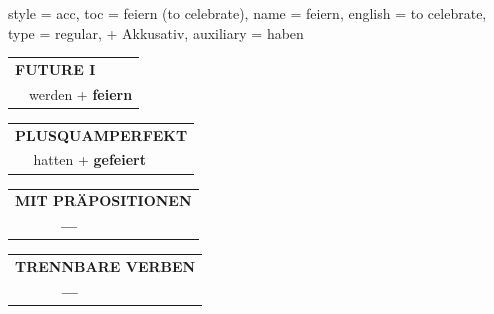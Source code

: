 \begin{verbentry}{
  style = {acc},
  toc = {feiern (to celebrate)},
  name = {feiern},
  english = {to celebrate},
  type = {regular, + Akkusativ},
  auxiliary = {haben}
}
\begin{tabular}{rl}
    \multicolumn{2}{l}{\textbf{FUTURE I} }\\
  &  werden + \textbf{feiern}\\
 
  \end{tabular}
\hfill
   \begin{tabular}{rl}
      \multicolumn{2}{l}{\textbf{PLUSQUAMPERFEKT}}\\
  &  hatten + \textbf{gefeiert}\\
  \end{tabular}
  
  
\vspace{10pt}

\begin{tabular}{lll}
\multicolumn{3}{l}{\textbf{MIT PRÄPOSITIONEN}}\\
& \textbf{---} & \\
\end{tabular}
\hfill
\begin{tabular}{lll}
\multicolumn{3}{l}{\textbf{TRENNBARE VERBEN}}\\
& \textbf{---} & \\
\end{tabular}
\vspace{-5pt}
\end{verbentry}

